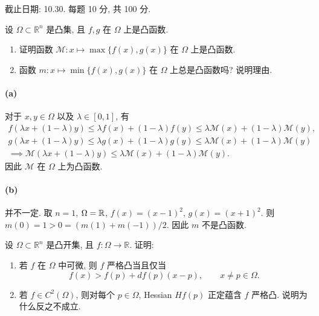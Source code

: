 \documentclass{article}
\begin{document}
截止日期: 10.30. 每题 10 分, 共 100 分.

\begin{problem}
  设 $\Omega\subset\mathbb{R}^n$ 是凸集, 且 $f,g$ 在 $\Omega$ 上是凸函数.
  \begin{enumerate}
    \item[(a)] 证明函数 $\mathcal{M}:x\mapsto\max\{f(x),g(x)\}$ 在 $\Omega$ 上是凸函数.
    \item[(b)] 函数 $m:x\mapsto\min\{f(x),g(x)\}$ 在 $\Omega$ 上总是凸函数吗? 说明理由.
  \end{enumerate}
\end{problem}

\begin{solution}
	\paragraph{(a)} 对于 $x, y \in \Omega$ 以及 $\lambda \in [0,1]$, 有
	\begin{gather*}
		f(\lambda x + (1-\lambda)y) \le \lambda f(x) + (1-\lambda)f(y) \le \lambda \mathcal{M}(x) + (1-\lambda)\mathcal{M}(y), \\
		g(\lambda x + (1-\lambda)y) \le \lambda g(x) + (1-\lambda)g(y) \le \lambda \mathcal{M}(x) + (1-\lambda)\mathcal{M}(y) \\
		\implies \mathcal{M}(\lambda x + (1-\lambda)y) \le \lambda \mathcal{M}(x) + (1-\lambda)\mathcal{M}(y).
	\end{gather*}
	因此 $\mathcal{M}$ 在 $\Omega$ 上为凸函数.

	\paragraph{(b)} 并不一定. 取 $n=1$, $\Omega = \mathbb{R}$, $f(x) = (x-1)^{2}$, $g(x) = (x+1)^{2}$. 则 $m(0) = 1 > 0 = (m(1) + m(-1))/2$. 因此 $m$ 不是凸函数.
\end{solution}



\begin{problem}
  设 $\Omega\subset\mathbb{R}^n$ 是凸开集, 且 $f:\Omega\to\mathbb{R}$. 证明:
  \begin{enumerate}
    \item[(a)] 若 $f$ 在 $\Omega$ 中可微, 则 $f$ 严格凸当且仅当
      \[
        f(x)>f(p)+df(p)(x-p),\qquad x\neq p\in\Omega.
      \]
    \item[(b)] 若 $f\in C^2(\Omega)$, 则对每个 $p\in\Omega$, Hessian $Hf(p)$ 正定蕴含 $f$ 严格凸. 说明为什么反之不成立.
  \end{enumerate}
\end{problem}
\end{document}
